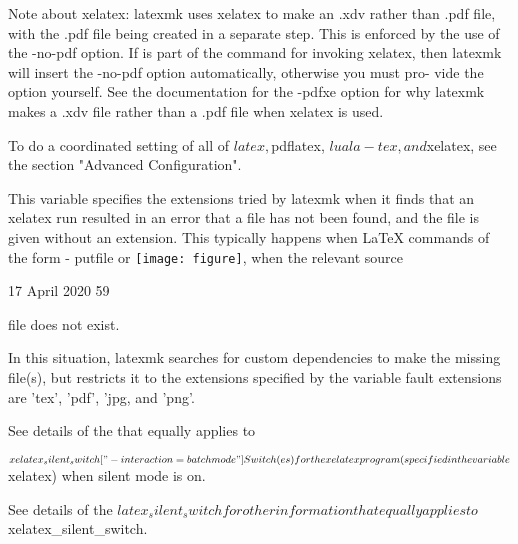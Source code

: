               Note  about xelatex: latexmk uses xelatex to make an .xdv rather
              than .pdf file, with the .pdf file being created in  a  separate
              step.  This is enforced by the use of the -no-pdf option.  If %
              is part of the command for invoking xelatex, then  latexmk  will
              insert the -no-pdf option automatically, otherwise you must pro-
              vide the option yourself.  See the documentation for the  -pdfxe
              option for why latexmk makes a .xdv file rather than a .pdf file
              when xelatex is used.

              To do a coordinated setting of all of $latex, $pdflatex, $luala-
              tex, and $xelatex, see the section "Advanced Configuration".


              This  variable specifies the extensions tried by latexmk when it
              finds that an xelatex run resulted in an error that a  file  has
              not  been  found,  and  the  file is given without an extension.
              This typically happens when LaTeX  commands  of  the  form  \in-
              put{file}  or \texttt{[image: figure]}, when the relevant source



                                 17 April 2020                              59








              file does not exist.

              In this situation, latexmk searches for custom  dependencies  to
              make  the  missing  file(s),  but restricts it to the extensions
              specified by the variable  %
              fault extensions are 'tex', 'pdf', 'jpg, and 'png'.

              See details of the %
              that equally applies to %

       $xelatex_silent_switch ["-interaction=batchmode"]
              Switch(es) for the xelatex program (specified  in  the  variable
              $xelatex) when silent mode is on.

              See  details  of  the $latex_silent_switch for other information
              that equally applies to $xelatex_silent_switch.




